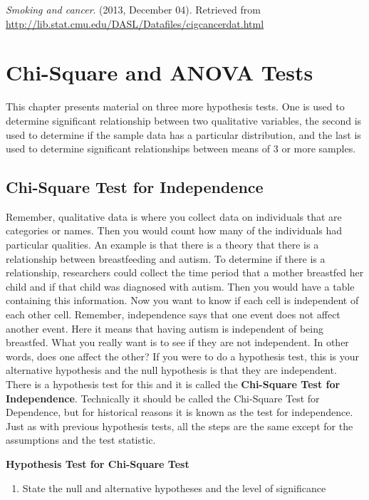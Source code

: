 \documentclass[]{book}
\providecommand{\tightlist}{%
  \setlength{\itemsep}{0pt}\setlength{\parskip}{0pt}}
\begin{document}
\emph{Smoking and cancer}. (2013, December 04). Retrieved from
\url{http://lib.stat.cmu.edu/DASL/Datafiles/cigcancerdat.html}

\hypertarget{chi-square-and-anova-tests}{%
\chapter{Chi-Square and ANOVA Tests}\label{chi-square-and-anova-tests}}

This chapter presents material on three more hypothesis tests. One is used to determine significant relationship between two qualitative variables, the second is used to determine if the sample data has a particular distribution, and the last is used to determine significant relationships between means of 3 or more samples.

\hypertarget{chi-square-test-for-independence}{%
\section{Chi-Square Test for Independence}\label{chi-square-test-for-independence}}

Remember, qualitative data is where you collect data on individuals that are categories or names. Then you would count how many of the individuals had particular qualities. An example is that there is a theory that there is a relationship between breastfeeding and autism. To determine if there is a relationship, researchers could collect the time period that a mother breastfed her child and if that child was diagnosed with autism. Then you would have a table containing this information. Now you want to know if each cell is independent of each other cell. Remember, independence says that one event does not affect another event. Here it means that having autism is independent of being breastfed. What you really want is to see if they are not independent. In other words, does one affect the other? If you were to do a hypothesis test, this is your alternative hypothesis and the null hypothesis is that they are independent. There is a hypothesis test for this and it is called the \textbf{Chi-Square Test for Independence}. Technically it should be called the Chi-Square Test for Dependence, but for historical reasons it is known as the test for independence. Just as with previous hypothesis tests, all the steps are the same except for the assumptions and the test statistic.

\textbf{Hypothesis Test for Chi-Square Test}

\begin{enumerate}
\def\labelenumi{\arabic{enumi}.}
\tightlist
\item
  State the null and alternative hypotheses and the level of significance
\end{enumerate}
\end{document}
